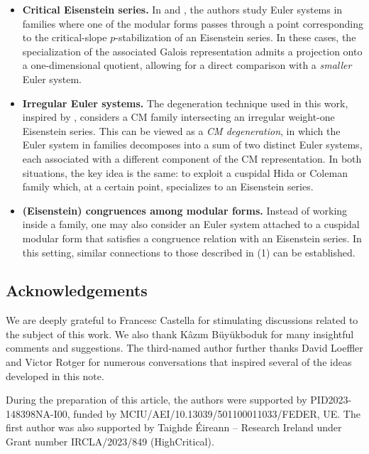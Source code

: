 \documentclass[a4paper,11pt]{amsart}
\theoremstyle{plain}
\theoremstyle{definition}
\theoremstyle{remark}
\numberwithin{equation}{section}
\begin{document}
\begin{itemize}
    \item[(1)] {\bf Critical Eisenstein series.} In \cite{LR1} and \cite{PR25}, the authors study Euler systems in families where one of the modular forms passes through a point corresponding to the critical-slope $p$-stabilization of an Eisenstein series. In these cases, the specialization of the associated Galois representation admits a projection onto a one-dimensional quotient, allowing for a direct comparison with a {\it smaller} Euler system.

    \item[(2)] {\bf Irregular Euler systems.} The degeneration technique used in this work, inspired by \cite{BSV}, considers a CM family intersecting an irregular weight-one Eisenstein series. This can be viewed as a {\it CM degeneration}, in which the Euler system in families decomposes into a sum of two distinct Euler systems, each associated with a different component of the CM representation. In both situations, the key idea is the same: to exploit a cuspidal Hida or Coleman family which, at a certain point, specializes to an Eisenstein series.
    
    \item[(3)] {\bf (Eisenstein) congruences among modular forms.} Instead of working inside a family, one may also consider an Euler system attached to a cuspidal modular form that satisfies a congruence relation with an Eisenstein series. In this setting, similar connections to those described in (1) can be established.  

\end{itemize}

\subsection{Acknowledgements}
We are deeply grateful to Francesc Castella for stimulating discussions related to the subject of this work. We also thank K\^az\i m B\"uy\"ukboduk for many insightful comments and suggestions. The third-named author further thanks David Loeffler and Victor Rotger for numerous conversations that inspired several of the ideas developed in this note.

During the preparation of this article, the authors were supported by PID2023-148398NA-I00, funded by MCIU/AEI/10.13039/501100011033/FEDER, UE. The first author was also supported by Taighde \'Eireann -- Research Ireland under Grant number IRCLA/2023/849 (HighCritical).
\end{document}
